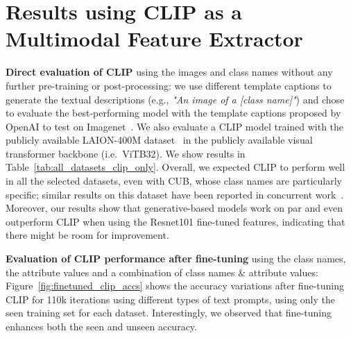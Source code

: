 \section{Results using CLIP as a Multimodal Feature Extractor} 
\label{sec:results_multimodal}
\textbf{Direct evaluation of CLIP} using the images and class names without any further pre-training or post-processing: we use different template captions to generate the textual descriptions (e.g., \textit{"An image of a [class name]"}) and chose to evaluate the best-performing model with the template captions proposed by OpenAI to test on Imagenet~\cite{openai_2022}.
We also evaluate a CLIP model trained with the publicly available LAION-400M dataset~\cite{LAION400M} in the publicly available visual transformer backbone (i.e.~ViTB32). We show results in Table~\ref{tab:all_datasets_clip_only}. Overall, we expected CLIP to perform well in all the selected datasets, even with CUB, whose class names are particularly specific; similar results on this dataset have been reported in concurrent work~\cite{Vogel2022VLTabooAA}. Moreover, our results show that generative-based models work on par and even outperform CLIP when using the Resnet101 fine-tuned features, indicating that there might be room for improvement. 


\textbf{Evaluation of CLIP performance after fine-tuning} using the class
names, the attribute values and a combination of class names
$\&$ attribute values: Figure~\ref{fig:finetuned_clip_accs} shows the accuracy
variations after fine-tuning CLIP for 110k iterations using different types of text prompts, using only the seen training set for each dataset. Interestingly, we observed that fine-tuning enhances both the seen and unseen accuracy.

